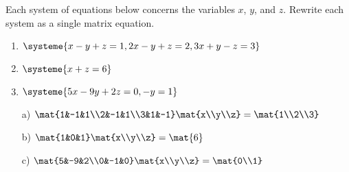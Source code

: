 \begin{exercises}
	\begin{problist}

		\prob Each system of equations below concerns the variables $x$, $y$, and $z$.
		Rewrite each system as a single matrix equation.
		\begin{enumerate}
			\item $\systeme{
											x-y+z=1,
											2x-y+z=2,
											3x+y-z=3
										}$
			\item $\systeme{
											x+z=6
										}$
			\item $\systeme{
											5x-9y+2z=0,
											-y=1
										}$
		\end{enumerate}
		\begin{solution}
			\begin{enumerate}
				\item[a)] $\mat{1&-1&1\\2&-1&1\\3&1&-1}\mat{x\\y\\z} = \mat{1\\2\\3}$
				\item[b)] $\mat{1&0&1}\mat{x\\y\\z} = \mat{6}$
				\item[c)] $\mat{5&-9&2\\0&-1&0}\mat{x\\y\\z} = \mat{0\\1}$
			\end{enumerate}
		\end{solution}		


\end{problist}
\end{exercises}
